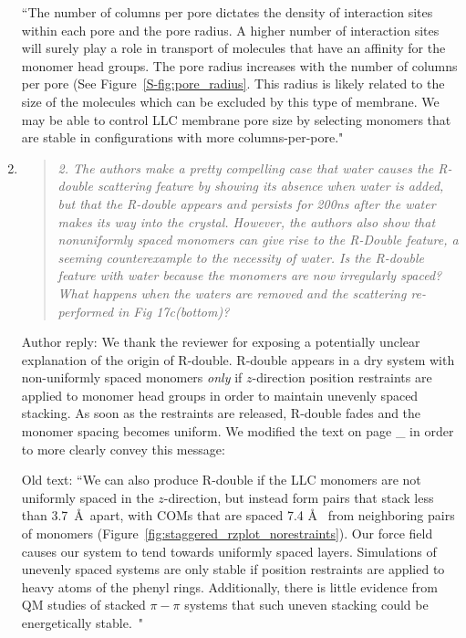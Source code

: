 \documentclass{article}
\begin{document}
\begin{enumerate}
    ``The number of columns per pore dictates the density of interaction sites within each pore and the 
    pore radius. A higher number of interaction sites will surely play a role in transport of molecules
    that have an affinity for the monomer head groups. 
    The pore radius increases with the number of columns per pore (See Figure~\ref{S-fig:pore_radius}. 
    This radius is likely related to the size of the molecules which can be excluded by this type of 
    membrane. We may be able to control LLC membrane pore size by selecting monomers that are stable
    in configurations with more columns-per-pore."
    
    \item \begin{quote}
    \textit{2. The authors make a pretty compelling case that water causes the R-double scattering feature
    by showing its absence when water is added, but that the R-double appears and persists for 200ns after
    the water makes its way into the crystal. However, the authors also show that nonuniformly spaced
    monomers can give rise to the R-Double feature, a seeming counterexample to the necessity of water.
    Is the R-double feature with water because the monomers are now irregularly spaced? What happens when
    the waters are removed and the scattering re-performed in Fig 17c(bottom)?}
    \end{quote}
    
    Author reply: We thank the reviewer for exposing a potentially unclear
    explanation of the origin of R-double. R-double appears in a dry system with
    non-uniformly spaced monomers \textit{only} if $z$-direction position
    restraints are applied to monomer head groups in order to maintain unevenly
    spaced stacking. As soon as the restraints are released, R-double fades and the
    monomer spacing becomes uniform. We modified the text on page _ in order to more
    clearly convey this message:
 
    Old text: ``We can also produce R-double if the LLC monomers are not
    uniformly spaced in the $z$-direction, but instead form pairs that stack less
    than 3.7~\AA~apart, with COMs that are spaced 7.4 \AA~ from neighboring pairs
    of monomers (Figure~\ref{fig:staggered_rzplot_norestraints}).  Our force field
    causes our system to tend towards uniformly spaced layers. Simulations of
    unevenly spaced systems are only stable if position restraints are applied to
    heavy atoms of the phenyl rings. Additionally, there is little evidence from QM
    studies of stacked $\pi-\pi$ systems that such uneven stacking could be
    energetically stable.~\cite{tauer_beyond_2005}"


\end{enumerate}
\end{document}

